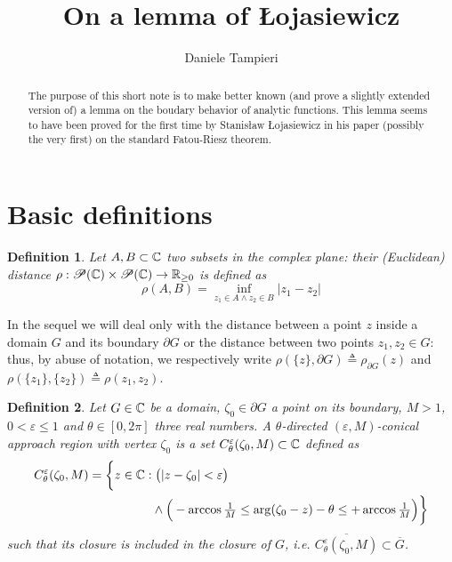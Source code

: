 \documentclass[a4paper,10pt]{article}
\title{On a lemma of Łojasiewicz}
\author{Daniele Tampieri}
\date{}
\newtheorem{defn}{Definition}
\begin{document}
\maketitle
{}
\begin{abstract}
  The purpose of this short note is to make better known (and prove a slightly extended version of) a lemma on the boudary behavior of analytic functions. This lemma seems to have been proved for the first time by Stanisław Łojasiewicz in his paper (possibly the very first) \cite{Lojasiewicz1950} on the standard Fatou-Riesz theorem.
\end{abstract}
\section{Basic definitions}
\begin{defn} Let $A,B\subset \Bbb C$ two subsets in the complex plane: their \emph{(Euclidean) distance} $\rho:\mathscr{P}(\Bbb C)\times\mathscr{P}(\Bbb C)\to\Bbb R_{\ge0}$ is defined as
  \begin{equation*}\label{eq:dist}
    \rho(A,B)=\inf_{z_1\in A \wedge z_2\in B}|z_1-z_2|
  \end{equation*}
\end{defn}
In the sequel we will deal only with the distance between a point $z$ inside a domain $G$ and its boundary $\partial G$ or the distance between two points $z_1, z_2\in G$: thus, by abuse of notation, we respectively write $\rho(\{z\},\partial G)\triangleq \rho_{\partial G}(z)$ and $\rho(\{z_1\},\{z_2\})\triangleq \rho(z_1,z_2)$.
\begin{defn}\label{def:appreg} Let $G\in\Bbb C$ be a domain, $\zeta_0 \in\partial G$ a point on its boundary, $M>1$, $0< \varepsilon \le 1$ and $\theta\in[0,2\pi]$ three real numbers. A $\theta$-\emph{directed $(\varepsilon,M)$-conical approach region with vertex $\zeta_0$} is a set $C_{\theta}^{\varepsilon}(\zeta_0,M)\subset\Bbb C$ defined as
  \begin{equation}
    \begin{split}
      C_{\theta}^{\varepsilon}(\zeta_0,M)=\bigg\{ z\in \Bbb C  : &\; \big(|z -\zeta_0|<\varepsilon\big) \\
      & \land\Big(-\arccos\tfrac{1}{M}\le\arg (\zeta_0- z) -\theta \le + \arccos\tfrac{1}{M}\Big)\bigg\}
    \end{split}
  \end{equation}
  such that its closure is included in the closure of $G$, i.e. $\overline{C_{\theta}^{\varepsilon}(\zeta_0,M)}\subset\overline{G}$.
\end{defn}
\end{document}
